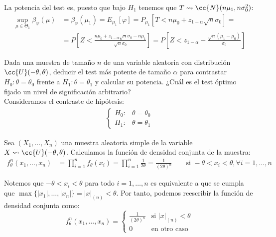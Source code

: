 \begin{ejercicio}
\begin{description}
        La potencia del test es, puesto que bajo $H_1$ tenemos que $T\rightsquigarrow \cc{N}(n\mu_1, n\sigma_0^2)$:
        \begin{align*}
            \sup_{\mu \in \Theta_1}\beta_\varphi(\mu) &= \beta_\varphi(\mu_1) = E_{\mu_1}[\varphi] = P_{\mu_1}[T < n\mu_0 + z_{1-\alpha}\sqrt{n}\sigma_0] =\\&= P\left[Z < \frac{n\mu_0 + z_{1-\alpha}\sqrt{n}\sigma_0 - n\mu_1}{\sqrt{n}\sigma_0}\right] = P\left[Z < z_{1-\alpha} - \frac{\sqrt{n}(\mu_1-\mu_0)}{\sigma_0}\right]
        \end{align*}
    \end{description}
\end{ejercicio}

\begin{ejercicio}
    Dada una muestra de tamaño $n$ de una variable aleatoria con distribución $\cc{U}(-\theta,\theta)$, deducir el test más potente de tamaño $\alpha$ para contrastar $H_0 : \theta = \theta_0$ frente a $H_1 : \theta = \theta_1$ y calcular su potencia. ¿Cuál es el test óptimo fijado un nivel de significación arbitrario?\\

    Consideramos el contraste de hipótesis:
    \begin{align*}
        \begin{cases}
            H_0: & \theta = \theta_0 \\
            H_1: & \theta = \theta_1
        \end{cases}
    \end{align*}

    Sea $(X_1, \ldots, X_n)$ una muestra aleatoria simple de la variable $X\rightsquigarrow \cc{U}(-\theta,\theta)$. Calculamos la función de densidad conjunta de la muestra:
    \begin{align*}
        f_\theta^n(x_1, \ldots, x_n) &= \prod_{i=1}^{n} f_\theta(x_i) = \prod_{i=1}^{n} \frac{1}{2\theta} = \frac{1}{(2\theta)^n}\qquad \text{si\ } -\theta < x_i < \theta, \forall i=1,\ldots,n
    \end{align*}

    Notemos que $-\theta< x_i < \theta$ para todo $i=1,\ldots,n$ es equivalente a que se cumpla que $\max\{|x_1|, \ldots, |x_n|\} = |x|_{(n)} < \theta$. Por tanto, podemos reescribir la función de densidad conjunta como:
    \begin{equation*}
        f_\theta^n(x_1, \ldots, x_n) = \begin{cases}
            \frac{1}{(2\theta)^n} & \text{si\ } |x|_{(n)} < \theta \\
            0 & \text{en otro caso}
        \end{cases}
    \end{equation*}


\end{ejercicio}
